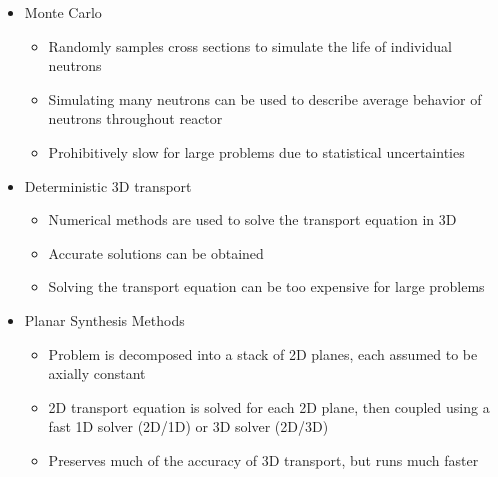 \begin{frame}

\begin{itemize}
    \item Monte Carlo
    \begin{itemize}
        \item Randomly samples cross sections to simulate the life of individual neutrons
        \item Simulating many neutrons can be used to describe average behavior of neutrons throughout reactor
        \item Prohibitively slow for large problems due to statistical uncertainties
    \end{itemize}
    \item Deterministic 3D transport
    \begin{itemize}
        \item Numerical methods are used to solve the transport equation in 3D
        \item Accurate solutions can be obtained
        \item Solving the transport equation can be too expensive for large problems
    \end{itemize}
    \item Planar Synthesis Methods
    \begin{itemize}
        \item Problem is decomposed into a stack of 2D planes, each assumed to be axially constant
        \item 2D transport equation is solved for each 2D plane, then coupled using a fast 1D solver (2D/1D) or 3D solver (2D/3D)
        \item Preserves much of the accuracy of 3D transport, but runs much faster
    \end{itemize}
\end{itemize}

\end{frame}


